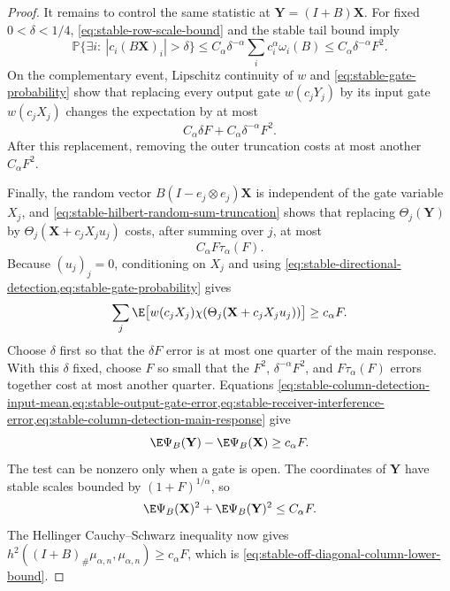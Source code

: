 \begin{proof}
It remains to control the same statistic at
\(\mathbf Y=(I+B)\mathbf X\).
For fixed \(0<\delta<1/4\),
\eqref{eq:stable-row-scale-bound} and the stable tail bound imply
\begin{equation}
 \mathbb P\{\exists i:\ |c_i(B\mathbf X)_i|>\delta\}
 \le C_\alpha\delta^{-\alpha}\sum_i c_i^\alpha\omega_i(B)
 \le C_\alpha\delta^{-\alpha}F^2.
 \label{eq:stable-output-gate-exception}
\end{equation}
On the complementary event, Lipschitz continuity of \(w\) and
\eqref{eq:stable-gate-probability} show that replacing every output
gate \(w(c_jY_j)\) by its input gate \(w(c_jX_j)\) changes the expectation
by at most
\begin{equation}
 C_\alpha\delta F+C_\alpha\delta^{-\alpha}F^2.
 \label{eq:stable-output-gate-error}
\end{equation}
After this replacement, removing the outer truncation costs at most another
\(C_\alpha F^2\).

Finally, the random vector
\(B(I-e_j\otimes e_j)\mathbf X\) is independent of the gate variable \(X_j\),
and \eqref{eq:stable-hilbert-random-sum-truncation} shows that replacing
\(\Theta_j(\mathbf Y)\) by
\(\Theta_j(\mathbf X+c_jX_ju_j)\) costs, after summing over \(j\), at most
\begin{equation}
 C_\alpha F\tau_\alpha(F).
 \label{eq:stable-receiver-interference-error}
\end{equation}
Because \((u_j)_j=0\), conditioning on \(X_j\) and using
\cref{eq:stable-directional-detection,eq:stable-gate-probability} gives
\begin{equation}
 \sum_j\E\bigl[
   w(c_jX_j)\chi(\Theta_j(\mathbf X+c_jX_ju_j))\bigr]
 \ge c_\alpha F.
 \label{eq:stable-column-detection-main-response}
\end{equation}
Choose \(\delta\) first so that the \(\delta F\) error is at most one quarter
of the main response.  With this \(\delta\) fixed, choose \(F\) so small that
the \(F^2\), \(\delta^{-\alpha}F^2\), and
\(F\tau_\alpha(F)\) errors together cost at most another quarter.
Equations
\cref{eq:stable-column-detection-input-mean,eq:stable-output-gate-error,eq:stable-receiver-interference-error,eq:stable-column-detection-main-response}
give
\[
 \E\Psi_B(\mathbf Y)-\E\Psi_B(\mathbf X)\ge c_\alpha F.
\]
The test can be nonzero only when a gate is open.
The coordinates of \(\mathbf Y\) have stable scales bounded by
\((1+F)^{1/\alpha}\), so
\[
 \E\Psi_B(\mathbf X)^2+\E\Psi_B(\mathbf Y)^2\le C_\alpha F.
\]
The Hellinger Cauchy--Schwarz inequality now gives
\(h^2((I+B)_\#\mu_{\alpha,n},\mu_{\alpha,n})\ge c_\alpha F\),
which is \eqref{eq:stable-off-diagonal-column-lower-bound}.


\end{proof}
